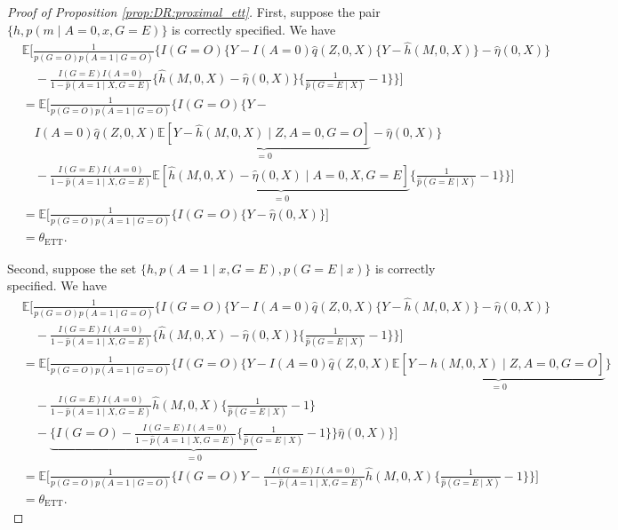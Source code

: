 \documentclass[10pt]{article}
\newcommand{\E}{\mathbb{E}}
\begin{document}
\begin{proof}[Proof of Proposition \ref{prop:DR:proximal_ett}]
First, suppose the pair $\{h,p(m\mid A=0,x,G=E)\}$ is correctly specified. We have
{\footnotesize \begin{align*}
    &\E\Big[\frac{1}{p(G=O)p(A=1\mid G=O)}\Big\{I(G=O)\big\{Y-I(A=0)\hat{q}(Z,0,X)\{Y-\hat{h}(M,0,X)\}-\hat{\eta}(0,X)\big\}\\
&\quad-\frac{I(G=E)I(A=0)}{1-\hat{p}(A=1\mid X,G=E)}
\{\hat{h}(M,0,X)-\hat{\eta}(0,X)\}\{\frac{1}{\hat{p}(G=E\mid X)}-1\}\Big\}\Big]\\
&=\E\Big[\frac{1}{p(G=O)p(A=1\mid G=O)}\Big\{I(G=O)\big\{Y-\\
&\quad I(A=0)\hat{q}(Z,0,X)\underbrace{\E[Y-\hat{h}(M,0,X)\mid Z,A=0,G=O]}_{=0}-\hat{\eta}(0,X)\big\}\\
&\quad-\frac{I(G=E)I(A=0)}{1-\hat{p}(A=1\mid X,G=E)}
\underbrace{\E[\hat{h}(M,0,X)-\hat{\eta}(0,X)\mid A=0,X,G=E]}_{=0}\{\frac{1}{\hat{p}(G=E\mid X)}-1\}\Big\}\Big]\\
&=\E\Big[\frac{1}{p(G=O)p(A=1\mid G=O)}\Big\{I(G=O)\big\{Y-\hat{\eta}(0,X)\big\}\Big]\\
&=\theta_{\text{ETT}}.
\end{align*}}

Second, suppose the set $\{h,p(A=1\mid x,G=E),p(G=E\mid x)\}$ is correctly specified. We have
\begingroup
\allowdisplaybreaks
{\footnotesize \begin{align*}
&\E\Big[\frac{1}{p(G=O)p(A=1\mid G=O)}\Big\{I(G=O)\big\{Y-I(A=0)\hat{q}(Z,0,X)\{Y-\hat{h}(M,0,X)\}-\hat{\eta}(0,X)\big\}\\
&\quad-\frac{I(G=E)I(A=0)}{1-\hat{p}(A=1\mid X,G=E)}
\{\hat{h}(M,0,X)-\hat{\eta}(0,X)\}\{\frac{1}{\hat{p}(G=E\mid X)}-1\}\Big\}\Big]\\
&=\E\Big[\frac{1}{p(G=O)p(A=1\mid G=O)}\Big\{I(G=O)\big\{Y-I(A=0)\hat{q}(Z,0,X)\underbrace{\E[Y-\hat{h}(M,0,X)\mid Z,A=0,G=O]}_{=0}\big\}\\
&\quad-\frac{I(G=E)I(A=0)}{1-\hat{p}(A=1\mid X,G=E)}
\hat{h}(M,0,X)\{\frac{1}{\hat{p}(G=E\mid X)}-1\}\\
&\quad-\underbrace{\big\{I(G=O)-\frac{I(G=E)I(A=0)}{1-\hat{p}(A=1\mid X,G=E)}\{\frac{1}{\hat{p}(G=E\mid X)}-1\}\big\}}_{=0}\hat{\eta}(0,X)\Big\}\Big]\\
&=\E\Big[\frac{1}{p(G=O)p(A=1\mid G=O)}\Big\{I(G=O)Y-\frac{I(G=E)I(A=0)}{1-\hat{p}(A=1\mid X,G=E)}
\hat{h}(M,0,X)\{\frac{1}{\hat{p}(G=E\mid X)}-1\}\Big\}\Big]\\
&=\theta_{\text{ETT}}.
\end{align*}}
\endgroup


\end{proof}
\end{document}
